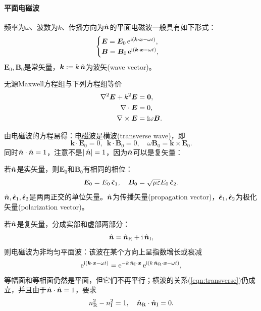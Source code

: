 \paragraph{平面电磁波}
频率为$\omega$、波数为$k$、传播方向为$\mathop{}\!\hat{\bm n}$的平面电磁波一般具有如下形式：
\begin{equation}
    \begin{cases}
        \bm E=\bm E_0\mathop{}\!\mathrm{e}^{\mathrm{i}(\bm k\cdot\bm x-\omega t)},\\
        \bm B=\bm B_0\mathop{}\!\mathrm{e}^{\mathrm{i}(\bm k\cdot\bm x-\omega t)},
    \end{cases}
\end{equation}
$\bm E_0,\bm B_0$是常矢量，$\bm k:=k\mathop{}\!\hat{\bm n}$为波矢(wave vector)。
\begin{example}{}{}
    无源Maxwell方程组与下列方程组等价
    \begin{align*}
        \nabla^2\bm E+k^2\bm E&=\bm 0,\\
        \nabla\cdot\bm E&=0,\\
        \nabla\times\bm E&=\mathrm{i}\omega\bm B.
    \end{align*}
\end{example}
由电磁波的方程易得：电磁波是横波(transverse wave)，即
\begin{equation}
    \label{eqn:transverse}
    \bm k\cdot\bm E_0=0,\enspace\bm k\cdot\bm B_0=0,\quad\omega\bm B_0=\bm k\times\bm E_0.
\end{equation}
同时$\mathop{}\!\hat{\bm n}\cdot\mathop{}\!\hat{\bm n}=1$，注意不是$|\mathop{}\!\hat{\bm n}|=1$，因为$\mathop{}\!\hat{\bm n}$可以是复矢量：
\begin{compactitem}
	\item 若$\mathop{}\!\hat{\bm n}$是实矢量，则$\bm E_0$和$\bm B_0$有相同的相位：
    \[
        \bm E_0=E_0\mathop{}\!\hat{\bm \epsilon}_1,\quad \bm B_0=\sqrt{\mu\varepsilon}E_0\mathop{}\!\hat{\bm \epsilon}_2.
    \]
    $\mathop{}\!\hat{\bm n},\mathop{}\!\hat{\bm \epsilon}_1,\mathop{}\!\hat{\bm \epsilon}_2$是两两正交的单位矢量。$\mathop{}\!\hat{\bm n}$为传播矢量(propagation vector)，$\mathop{}\!\hat{\bm \epsilon}_1,\mathop{}\!\hat{\bm \epsilon}_2$为极化矢量(polarization vector)。
	\item 若$\mathop{}\!\hat{\bm n}$是复矢量，分成实部和虚部两部分：
    \[
        \mathop{}\!\hat{\bm n}=\mathop{}\!\hat{\bm n}_\text R+\mathrm{i}\mathop{}\!\hat{\bm n}_\text I,
    \]
    则电磁波为非均匀平面波：该波在某个方向上呈指数增长或衰减
    \[
        \mathop{}\!\mathrm{e}^{\mathrm{i}(\bm k\cdot\bm x-\omega t)}=\mathop{}\!\mathrm{e}^{-k\mathop{}\!\hat{\bm n}_\text I\cdot\bm x}\mathop{}\!\mathrm{e}^{\mathrm{i}(k\mathop{}\!\hat{\bm n}_\text R\cdot\bm x-\omega t)},
    \]
    等幅面和等相面仍然是平面，但它们不再平行；横波的关系(\ref{eqn:transverse})仍成立，并且由于$\mathop{}\!\hat{\bm n}\cdot\mathop{}\!\hat{\bm n}=1$，要求
    \[
        n_\text R^2-n_\text I^2=1,\quad \mathop{}\!\hat{\bm n}_\text R\cdot\mathop{}\!\hat{\bm n}_\text I=0.
    \]
\end{compactitem}
